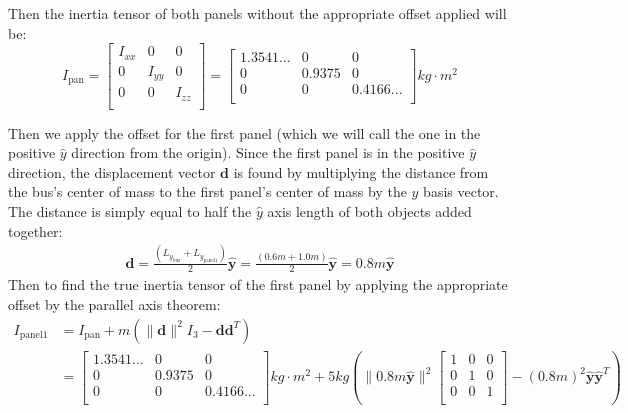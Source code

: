 \documentclass[titlepage]{article}
\begin{document}
Then the inertia tensor of both panels without the appropriate offset applied will be:
\begin{equation}
	I_{\text{pan}}=
	\begin{bmatrix}
		I_{xx} & 0 & 0 \\
		0 & I_{yy} & 0 \\
		0 & 0 & I_{zz} \\
	\end{bmatrix}=
	\begin{bmatrix}
		1.3541... & 0 & 0 \\
		0 & 0.9375 & 0 \\
		0 & 0 & 0.4166... \\
	\end{bmatrix}kg\cdot m^2
\end{equation}

Then we apply the offset for the first panel (which we will call the one in the positive $\hat{y}$ direction from the origin). Since the first panel is in the positive $\hat{y}$ direction, the displacement vector $\boldsymbol{d}$ is found by multiplying the distance from the bus's center of mass to the first panel's center of mass by the $\hat{y}$ basis vector. The distance is simply equal to half the $\hat{y}$ axis length of both objects added together:
\begin{equation}
	\begin{split}
		\boldsymbol{d}=\frac{\left(L_{y_{\text{bus}}}+L_{y_{\text{panel1}}}\right)}{2}\hat{\boldsymbol{y}}=\frac{\left(0.6m+1.0m\right)}{2}\hat{\boldsymbol{y}}=0.8m\hat{\boldsymbol{y}}
	\end{split}
\end{equation}
Then to find the true inertia tensor of the first panel by applying the appropriate offset by the parallel axis theorem:
\tiny
\begin{equation}
	\begin{split}
		I_{\text{panel1}}&=I_{\text{pan}}+m\left(\|\boldsymbol{d}\|^2I_3-\boldsymbol{d}\boldsymbol{d}^T\right) \\
		&=
		\begin{bmatrix}
			1.3541... & 0 & 0 \\
			0 & 0.9375 & 0 \\
			0 & 0 & 0.4166... \\
		\end{bmatrix}kg\cdot m^2+5kg\left(\|0.8m\hat{\boldsymbol{y}}\|^2
		\begin{bmatrix}
			1 & 0 & 0 \\
			0 & 1 & 0 \\
			0 & 0 & 1 \\
		\end{bmatrix}-(0.8m)^2\hat{\boldsymbol{y}}\hat{\boldsymbol{y}}^T\right)
	\end{split}
\end{equation}
\normalsize
\end{document}
